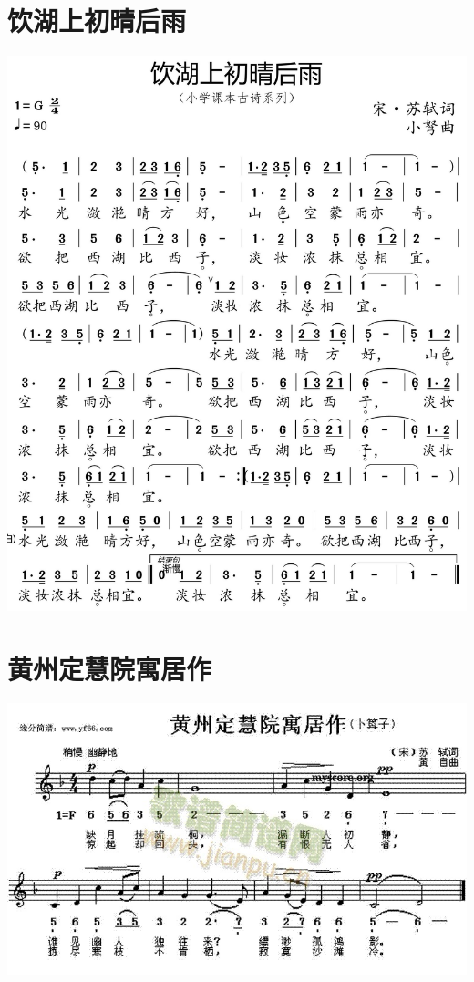 \documentclass[cn,pad,chinesefont=nofont,twocol]{elegantbook}
\begin{document}
\section{饮湖上初晴后雨}
    \includegraphics[width=\textwidth]{dongxiao/20200627-苏轼-饮湖上初晴后雨.jpg} 
\section{黄州定慧院寓居作}
    \includegraphics[width=\textwidth]{dongxiao/20200627-苏轼-黄州定慧院寓居作.jpg} 
\end{document}
